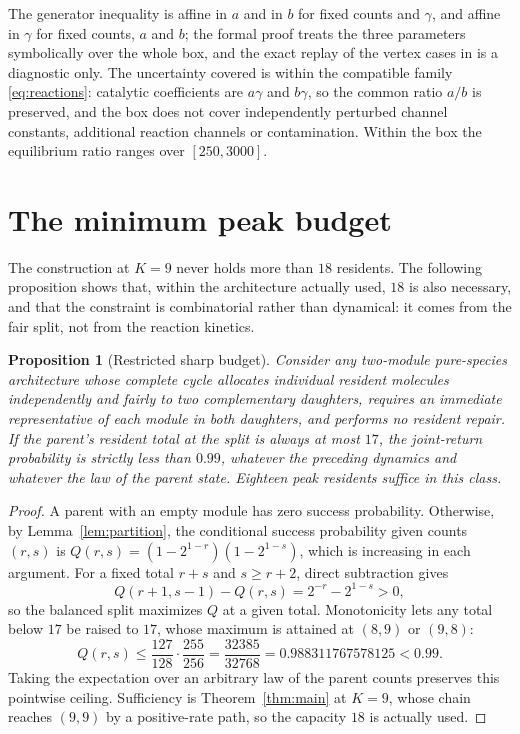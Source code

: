 \documentclass[11pt,a4paper]{article}
\theoremstyle{plain}
\newtheorem{proposition}[theorem]{Proposition}
\theoremstyle{definition}
\theoremstyle{remark}
\begin{document}
The generator inequality is affine in $a$ and in $b$ for fixed counts and $\gamma$, and affine in $\gamma$ for fixed counts, $a$ and $b$; the formal proof treats the three parameters symbolically over the whole box, and the exact replay of the vertex cases in  is a diagnostic only. The uncertainty covered is within the compatible family \eqref{eq:reactions}: catalytic coefficients are $a\gamma$ and $b\gamma$, so the common ratio $a/b$ is preserved, and the box does not cover independently perturbed channel constants, additional reaction channels or contamination. Within the box the equilibrium ratio ranges over $[250,3000]$.

\section{The minimum peak budget}\label{sec:budget}
The construction at $K=9$ never holds more than $18$ residents. The following proposition shows that, within the architecture actually used, $18$ is also necessary, and that the constraint is combinatorial rather than dynamical: it comes from the fair split, not from the reaction kinetics.

\begin{proposition}[Restricted sharp budget]\label{prop:budget}
Consider any two-module pure-species architecture whose complete cycle allocates individual resident molecules independently and fairly to two complementary daughters, requires an immediate representative of each module in both daughters, and performs no resident repair. If the parent's resident total at the split is always at most $17$, the joint-return probability is strictly less than $0.99$, whatever the preceding dynamics and whatever the law of the parent state. Eighteen peak residents suffice in this class.
\end{proposition}
\begin{proof}
A parent with an empty module has zero success probability. Otherwise, by Lemma~\ref{lem:partition}, the conditional success probability given counts $(r,s)$ is $Q(r,s)=(1-2^{1-r})(1-2^{1-s})$, which is increasing in each argument. For a fixed total $r+s$ and $s\ge r+2$, direct subtraction gives
\[
 Q(r+1,s-1)-Q(r,s)=2^{-r}-2^{1-s}>0 ,
\]
so the balanced split maximizes $Q$ at a given total. Monotonicity lets any total below $17$ be raised to $17$, whose maximum is attained at $(8,9)$ or $(9,8)$:
\[
 Q(r,s)\le\frac{127}{128}\cdot\frac{255}{256}=\frac{32385}{32768}=0.988311767578125<0.99 .
\]
Taking the expectation over an arbitrary law of the parent counts preserves this pointwise ceiling. Sufficiency is Theorem~\ref{thm:main} at $K=9$, whose chain reaches $(9,9)$ by a positive-rate path, so the capacity $18$ is actually used.
\end{proof}
\end{document}
